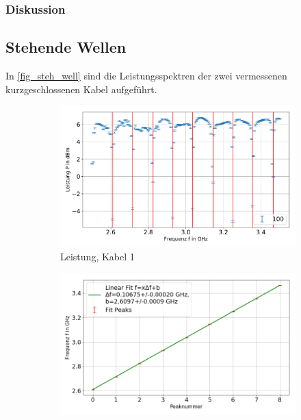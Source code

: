 \documentclass[
	a4paper,
	12pt,
	pagesize,
	ngerman
]{scrartcl}
\begin{document}
	\subsubsection*{Diskussion}

	\subsection{Stehende Wellen}
	In \cref{fig_steh_well} sind die Leistungsspektren der zwei vermessenen kurzgeschlossenen Kabel aufgeführt.

	\begin{figure}[H]
        \centering
        \begin{subfigure}[b]{0.495\textwidth}
            \centering
            \includegraphics[width=\textwidth]{img/100}
            \caption%
            {Leistung, Kabel 1}
            \label{fig_leistung_100}
        \end{subfigure}
        \hfill
        \begin{subfigure}[b]{0.495\textwidth}
            \centering
            \includegraphics[width=\textwidth]{img/100_fit}

\end{subfigure}
\end{figure}
\end{document}

